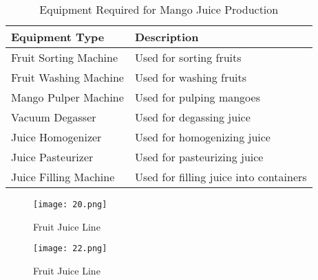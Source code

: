 \documentclass{article}
\begin{document}
\begin{table}[h]
\centering
\begin{tabular}{|l|l|}
\hline
\textbf{Equipment Type} & \textbf{Description} \\ \hline
Fruit Sorting Machine & Used for sorting fruits \\ \hline
Fruit Washing Machine & Used for washing fruits \\ \hline
Mango Pulper Machine & Used for pulping mangoes \\ \hline
Vacuum Degasser & Used for degassing juice \\ \hline
Juice Homogenizer & Used for homogenizing juice \\ \hline
Juice Pasteurizer & Used for pasteurizing juice \\ \hline
Juice Filling Machine & Used for filling juice into containers \\ \hline
\end{tabular}
\caption{Equipment Required for Mango Juice Production}
\label{table:equipment}
\end{table}

\begin{figure}[H]
    \centering
    \texttt{[image: 20.png]}
    \caption{Fruit Juice Line}
    \label{fig:plant}
\end{figure}

\begin{figure}[H]
    \centering
    \texttt{[image: 22.png]}
    \caption{Fruit Juice Line}
    \label{fig:plant}
\end{figure}
\end{document}

